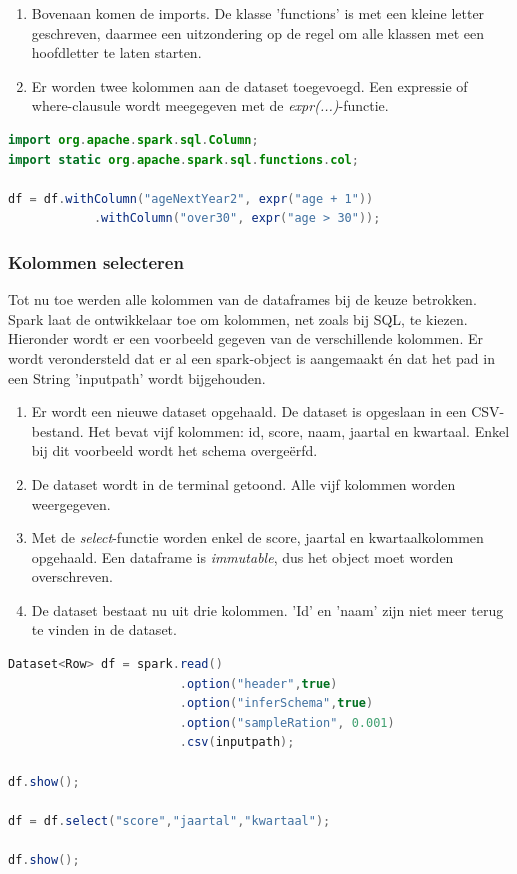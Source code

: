 \documentclass[a4paper,10pt,twoside]{report}
\begin{document}
\begin{enumerate}
	\item Bovenaan komen de imports. De klasse 'functions' is met een kleine letter geschreven, daarmee een uitzondering op de regel om alle klassen met een hoofdletter te laten starten.
	\item Er worden twee kolommen aan de dataset toegevoegd. Een expressie of where-clausule wordt meegegeven met de \textit{expr(...)}-functie.
\end{enumerate}

\begin{lstlisting}[language=Java]
import org.apache.spark.sql.Column;
import static org.apache.spark.sql.functions.col;

df = df.withColumn("ageNextYear2", expr("age + 1"))
			.withColumn("over30", expr("age > 30"));
\end{lstlisting}

\subsubsection{Kolommen selecteren}
Tot nu toe werden alle kolommen van de dataframes bij de keuze betrokken. Spark laat de ontwikkelaar toe om kolommen, net zoals bij SQL, te kiezen. Hieronder wordt er een voorbeeld gegeven van de verschillende kolommen. Er wordt verondersteld dat er al een spark-object is aangemaakt én dat het pad in een String 'inputpath' wordt bijgehouden.

\begin{enumerate}
	\item Er wordt een nieuwe dataset opgehaald. De dataset is opgeslaan in een CSV-bestand. Het bevat vijf kolommen: id, score, naam, jaartal en kwartaal. Enkel bij dit voorbeeld wordt het schema overgeërfd. 
	\item De dataset wordt in de terminal getoond. Alle vijf kolommen worden weergegeven.
	\item Met de \textit{select}-functie worden enkel de score, jaartal en kwartaalkolommen opgehaald. Een dataframe is \textit{immutable}, dus het object moet worden overschreven.
	\item De dataset bestaat nu uit drie kolommen. 'Id' en 'naam' zijn niet meer terug te vinden in de dataset.
\end{enumerate}

\begin{lstlisting}[language=Java]
Dataset<Row> df = spark.read()
						.option("header",true)
						.option("inferSchema",true)
						.option("sampleRation", 0.001)
						.csv(inputpath);

df.show();

df = df.select("score","jaartal","kwartaal");

df.show();
\end{lstlisting}
\end{document}
